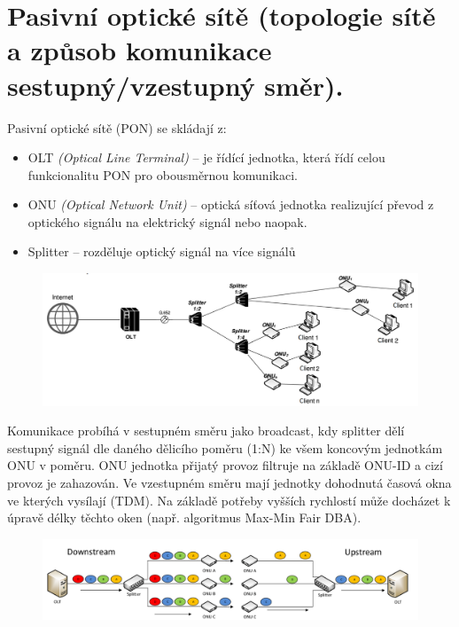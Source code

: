 \clearpage
\section{Pasivní optické sítě (topologie sítě a způsob komunikace sestupný/vzestupný směr).}
Pasivní optické sítě (PON) se skládají z:
\begin{itemize}
    \item OLT \emph{(Optical Line Terminal)} -- je řídící jednotka, která řídí celou funkcionalitu PON pro obousměrnou komunikaci.
    \item ONU \emph{(Optical Network Unit)} -- optická síťová jednotka realizující převod z optického signálu na elektrický signál nebo naopak.
    \item Splitter -- rozděluje optický signál na více signálů
\end{itemize}
\begin{figure} [h]
    \centering
    \includegraphics[width=\textwidth]{snimky/PONTopologie.png}
    \label{fig:pon}
\end{figure}

Komunikace probíhá v sestupném směru jako broadcast, kdy splitter dělí sestupný signál dle daného dělicího poměru (1:N) ke všem koncovým jednotkám ONU v poměru. ONU jednotka přijatý provoz filtruje na základě ONU-ID a cizí provoz je zahazován. Ve vzestupném směru mají jednotky dohodnutá časová okna ve kterých vysílají (TDM). Na základě potřeby vyšších rychlostí může docházet k úpravě délky těchto oken (např. algoritmus Max-Min Fair DBA).

\begin{figure} [h]
    \centering
    \includegraphics[width=\textwidth]{snimky/upDownPON.png}
\end{figure}

